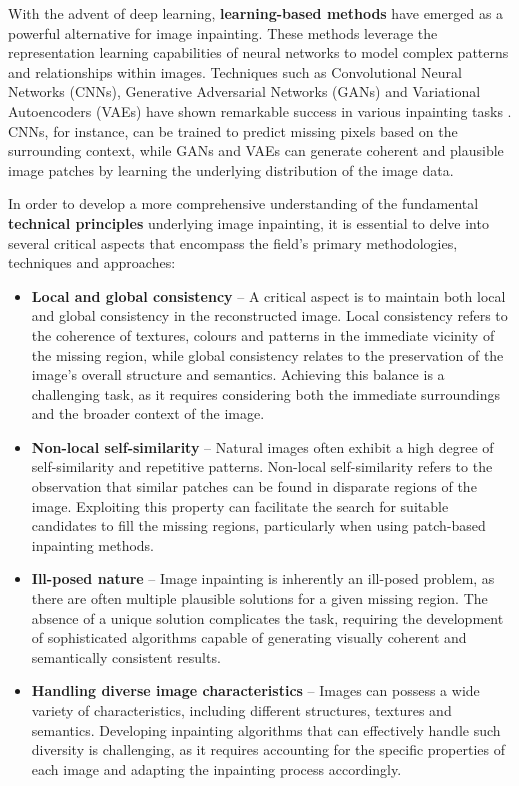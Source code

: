 With the advent of deep learning, \textbf{learning-based methods} have emerged as a powerful alternative for image inpainting. These methods leverage the representation learning capabilities of neural networks to model complex patterns and relationships within images. Techniques such as Convolutional Neural Networks (CNNs), Generative Adversarial Networks (GANs) and Variational Autoencoders (VAEs) have shown remarkable success in various inpainting tasks \supercite{context-encoders, semanting-inpainting, context-inpainting, free-form-inpainting}. CNNs, for instance, can be trained to predict missing pixels based on the surrounding context, while GANs and VAEs can generate coherent and plausible image patches by learning the underlying distribution of the image data.

In order to develop a more comprehensive understanding of the fundamental \textbf{technical principles} underlying image inpainting, it is essential to delve into several critical aspects that encompass the field's primary methodologies, techniques and approaches:
\begin{itemize}[leftmargin=1.5em]
    \setlength\itemsep{0.2cm}

    \item \textbf{Local and global consistency} -- A critical aspect is to maintain both local and global consistency in the reconstructed image. Local consistency refers to the coherence of textures, colours and patterns in the immediate vicinity of the missing region, while global consistency relates to the preservation of the image's overall structure and semantics. Achieving this balance is a challenging task, as it requires considering both the immediate surroundings and the broader context of the image.

    \item \textbf{Non-local self-similarity} -- Natural images often exhibit a high degree of self-similarity and repetitive patterns. Non-local self-similarity refers to the observation that similar patches can be found in disparate regions of the image. Exploiting this property can facilitate the search for suitable candidates to fill the missing regions, particularly when using patch-based inpainting methods.

    \item \textbf{Ill-posed nature} -- Image inpainting is inherently an ill-posed problem, as there are often multiple plausible solutions for a given missing region. The absence of a unique solution complicates the task, requiring the development of sophisticated algorithms capable of generating visually coherent and semantically consistent results.

    \item \textbf{Handling diverse image characteristics} -- Images can possess a wide variety of characteristics, including different structures, textures and semantics. Developing inpainting algorithms that can effectively handle such diversity is challenging, as it requires accounting for the specific properties of each image and adapting the inpainting process accordingly.
\end{itemize}

